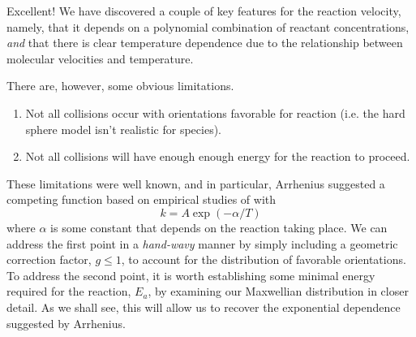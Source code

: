 Excellent! We have discovered a couple of key features for the reaction velocity, namely, that it depends on a polynomial combination of reactant concentrations, \textit{and} that there is clear temperature dependence due to the relationship between molecular velocities and temperature.

There are, however, some obvious limitations.
\begin{enumerate}
  \item Not all collisions occur with orientations favorable for reaction (i.e. the hard sphere model isn't realistic for species).
  \item Not all collisions will have enough enough energy for the reaction to proceed.
\end{enumerate}
These limitations were well known, and in particular, Arrhenius suggested a competing function based on empirical studies of with
\begin{equation}
  k = A\exp(-\alpha/T)
\end{equation}
where $\alpha$ is some constant that depends on the reaction taking place. We can address the first point in a \textit{hand-wavy} manner by simply including a geometric correction factor, $g\leq 1$, to account for the distribution of favorable orientations. To address the second point, it is worth establishing some minimal energy required for the reaction, $E_a$, by examining our Maxwellian distribution in closer detail. As we shall see, this will allow us to recover the exponential dependence suggested by Arrhenius.

